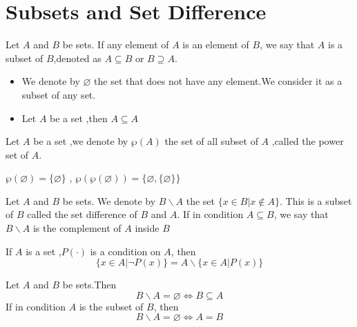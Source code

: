 \documentclass{book}
\numberwithin{equation}{section}
\begin{document}
\section{Subsets and Set Difference}
\begin{definitionenv}
    Let $A$ and $B$ be sets. If any element of $A$ is an element of $B$, we say that $A$ is a subset of $B$,denoted as $A \subseteq B$ or $B\supseteq  A$.
\end{definitionenv}
\begin{exampleenv}
    \quad
   \begin{itemize}
    \item  We denote by $\varnothing $ the set that does not have any element.We consider it as a subset of any set.
   \item  Let $A$ be a set ,then $A\subseteq A$
    \end{itemize}
\end{exampleenv}
\begin{definitionenv}
    Let $A$ be a set ,we denote by $\wp  (A)$ the set of all subset of $A$ ,called the power set of $A$.
\end{definitionenv}
\begin{exampleenv}
    $\wp (\varnothing)=\{\varnothing\}$
    ,
    $\wp (\wp (\varnothing))=\{\varnothing,\{\varnothing\}\}$
\end{exampleenv}
\begin{definitionenv}
    Let $A$ and $B$ be sets. We denote by $B \backslash A$ the set $\{x\in B|x\notin A\}$. This is a subset of $B$ called the set difference of $B$ and $A$.
    \newline
    If in condition $A \subseteq B$, we say that $B\backslash A$ is the complement of $A$ inside $B$
\end{definitionenv}
\begin{exampleenv}
    If $A$ is a set ,$P(\cdot)$ is  a condition on $A$, then $$\{x\in A |\neg P(x)\}=A\backslash\{x\in A|P(x)\}$$
\end{exampleenv}
\begin{propositionenv}
    Let $A$ and $B$ be sets.Then $$B\backslash A=\varnothing \Leftrightarrow B\subseteq A$$
    If in condition $A$ is the subset of $B$, then $$B\backslash A=\varnothing \Leftrightarrow A=B$$
\end{propositionenv}
\end{document}
